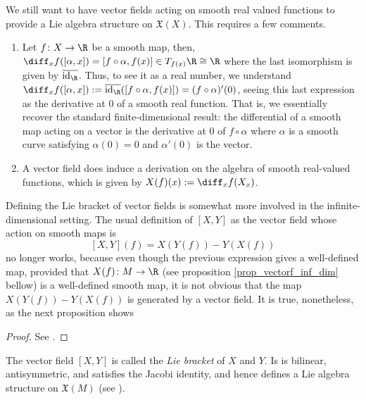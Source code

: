 \begin{obs}
    We still want to have vector fields acting on smooth real valued functions to provide a Lie algebra structure on \(\mathfrak{X}(X)\). This requires a few comments.
    \begin{enumerate}
        \item Let \(f \colon X \to \R\) be a smooth map, then, \(\diff_xf([\alpha, x]) = [f \circ \alpha, f(x)] \in T_{f(x)}\R \cong \R\) where the last isomorphism is given by \(\overline{\mathrm{id}_\R}\). Thus, to see it as a real number, we understand \(\diff_xf([\alpha, x]):=\overline{\mathrm{id}_\R}([f\circ \alpha, f(x)])=(f \circ \alpha)'(0)\), seeing this last expression as the derivative at \(0\) of a smooth real function. That is, we essentially recover the standard finite-dimensional result: the differential of a smooth map acting on a vector is the derivative at \(0\) of \(f \circ \alpha\) where \(\alpha\) is a smooth curve satisfying \(\alpha(0)=0\) and \(\alpha'(0)\) is the vector.
        \item A vector field does induce a derivation on the algebra of smooth real-valued functions, which is given by \(X(f)(x):=\diff_xf(X_x)\). 
    \end{enumerate}
\end{obs}

Defining the Lie bracket of vector fields is somewhat more involved in the infinite-dimensional setting. The usual definition of \([X,Y]\) as the vector field whose action on smooth maps is 
\[
[X,Y](f)=X(Y(f))-Y(X(f))
\]
no longer works, because even though the previous expression gives a well-defined map, provided that \(X(f)\colon M \to \R\) (see proposition \ref{prop_vectorf_inf_dim} bellow) is a well-defined smooth map, it is not obvious that the map \(X(Y(f))-Y(X(f))\) is generated by a vector field. It is true, nonetheless, as the next proposition shows

\begin{proof}
    See \parencite[Prop. V-1.1 and Prop V-1.3]{SergeLang}.
\end{proof}
The vector field \([X,Y]\) is called the \textit{Lie bracket} of \(X\) and \(Y\). Is is bilinear, antisymmetric, and satisfies the Jacobi identity, and hence defines a Lie algebra structure on \(\mathfrak{X}(M)\) (see \parencite[Cor. 1.4]{SergeLang}). \\

